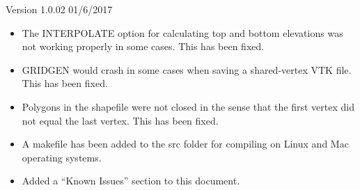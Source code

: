 \item Version 1.0.02 01/6/2017
\begin{itemize}[label=--]
  \item The INTERPOLATE option for calculating top and bottom elevations was not working properly in some cases. This has been fixed.
  \item GRIDGEN would crash in some cases when saving a shared-vertex VTK file. This has been fixed.
  \item Polygons in the shapefile were not closed in the sense that the first vertex did not equal the last vertex. This has been fixed.
  \item A makefile has been added to the src folder for compiling on Linux and Mac operating systems.
  \item Added a ``Known Issues'' section to this document.
\end{itemize}
